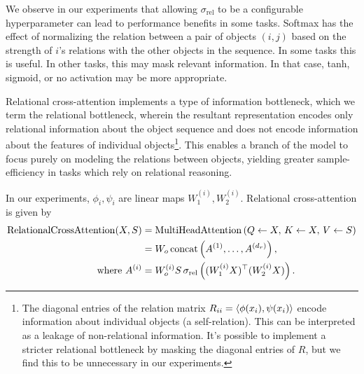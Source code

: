 We observe in our experiments that allowing $\sigma_{\mathrm{rel}}$ to be a configurable hyperparameter can lead to performance benefits in some tasks. Softmax has the effect of normalizing the relation between a pair of objects $(i,j)$ based on the strength of $i$'s relations with the other objects in the sequence. In some tasks this is useful. In other tasks, this may mask relevant information. In that case, tanh, sigmoid, or no activation may be more appropriate.

Relational cross-attention implements a type of information bottleneck, which we term the relational bottleneck, wherein the resultant representation encodes only relational information about the object sequence and does not encode information about the features of individual objects\footnote{The diagonal entries of the relation matrix $R_{ii} = \left \langle \phi(x_i), \psi(x_i) \right\rangle$ encode information about individual objects (a self-relation). This can be interpreted as a leakage of non-relational information. It's possible to implement a stricter relational bottleneck by masking the diagonal entries of $R$, but we find this to be unnecessary in our experiments.}. This enables a branch of the model to focus purely on modeling the relations between objects, yielding greater sample-efficiency in tasks which rely on relational reasoning.


In our experiments, $\phi_i, \psi_i$ are linear maps $W_1^{(i)}, W_2^{(i)}$. Relational cross-attention is given by
\begin{equation}
    \begin{split}
        \mathrm{RelationalCrossAttention}(X, S) &= \mathrm{MultiHeadAttention}\left(Q \gets X,\, K \gets X,\, V \gets S\right) \\
        &= W_o \, \mathrm{concat}\left(A^{(1)}, \ldots, A^{(d_r)}\right), \\
        \text{where } A^{(i)} &= W_o^{(i)} S \, \sigma_{\mathrm{rel}}\left((W_1^{(i)} X)^\top (W_2^{(i)} X)\right).
    \end{split}
\end{equation}

